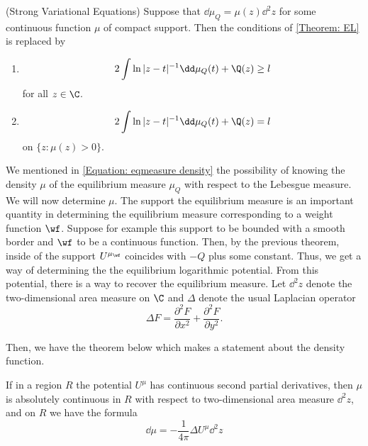 \begin{teorema} \label{Theorem: Euler-Lagrange} (Strong Variational Equations)
	Suppose that $\dd \mu_Q = \mu(z) \dd^2 z$ for some continuous function $\mu$ of compact support. Then the conditions of \autoref{Theorem: EL} is replaced by
	\begin{enumerate}
		\item
		\begin{equation}
			2 \int \ln{|z-t|^{-1}} \dd \mu_Q(t) + \Q(z) \geq l
		\end{equation}
		for all $z \in \C$.
		\item
		\begin{equation}
			2 \int \ln{|z-t|^{-1}} \dd \mu_Q(t) + \Q(z) = l
		\end{equation}
		on $\{z : \mu(z) > 0\}$.
	\end{enumerate}
\end{teorema} 

We mentioned in \eqref{Equation: eqmeasure density} the possibility of knowing the density $\mu$ of the equilibrium measure $\mu_Q$ with respect to the Lebesgue measure. We will now determine $\mu$. The support the equilibrium measure is an important quantity in determining the equilibrium measure corresponding to a weight function $\wf$. Suppose for example this support to be bounded with a smooth border and $\wf$ to be a continuous function. Then, by the previous theorem, inside of the support $U^{\mu_\wf}$ coincides with $-Q$ plus some constant. Thus, we get a way of determining the the equilibrium logarithmic potential. From this potential, there is a way to recover the equilibrium measure. Let $\dd^2 z$ denote the two-dimensional area measure on $\C$ and $\Delta$ denote the usual Laplacian operator
\begin{equation}
	\Delta F = \frac{\partial^2 F}{\partial x^2} + \frac{\partial^2 F}{\partial y^2}.
\end{equation}

Then, we have the theorem below which makes a statement about the density function. 

\begin{teorema} \cite{saff2024logarithmic}
	If in a region $R$ the potential $U^\mu$ has continuous second partial
	derivatives, then $\mu$ is absolutely continuous in $R$ with respect to two-dimensional	area measure $\dd^2 z$, and on $R$ we have the formula
	\begin{equation}
		\dd \mu = - \frac{1}{4\pi} \Delta U^\mu \dd^2 z
	\end{equation}
\end{teorema}

